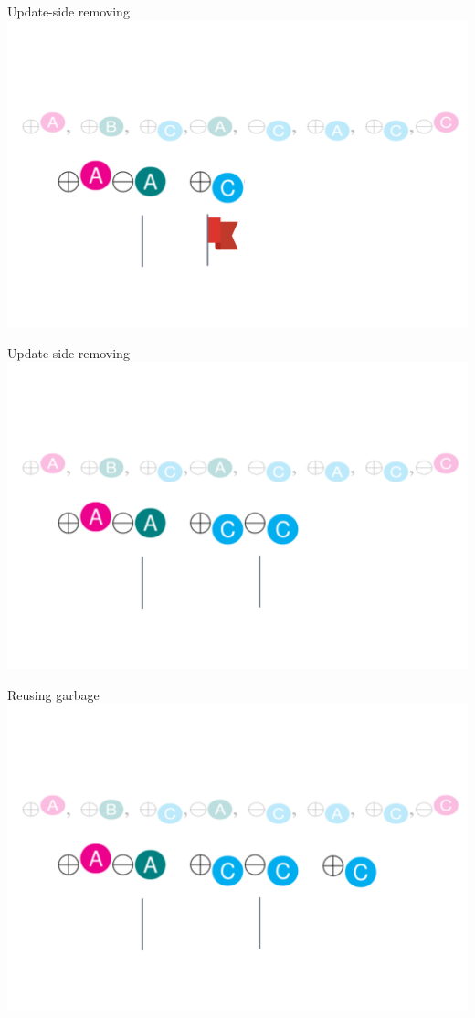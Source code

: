 \documentclass[english]{beamer} %
\begin{document}
\begin{frame}{Update-side removing}
\includegraphics[scale=0.5]{fig/update_remove_3}
\end{frame}

\begin{frame}{Update-side removing}
\includegraphics[scale=0.5]{fig/update_remove_4}
\end{frame}


\begin{frame}{Reusing garbage }
\includegraphics[scale=0.5]{fig/reusing_garbage_1}
\end{frame}
\end{document}

